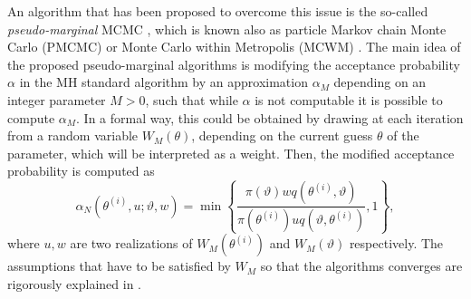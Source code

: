 An algorithm that has been proposed to overcome this issue is the so-called \textit{pseudo-marginal} MCMC \cite{DPD15,MLR16}, which is known also as particle Markov chain Monte Carlo (PMCMC) \cite{ADH10} or Monte Carlo within Metropolis (MCWM) \cite{AnR09}. The main idea of the proposed pseudo-marginal algorithms is modifying the acceptance probability $\alpha$ in the MH standard algorithm by an approximation $\alpha_M$ depending on an integer parameter $M > 0$, such that while $\alpha$ is not computable it is possible to compute $\alpha_M$. In a formal way, this could be obtained by drawing at each iteration from a random variable $W_M(\theta)$, depending on the current guess $\theta$ of the parameter, which will be interpreted as a weight. Then, the modified acceptance probability is computed as
\begin{equation}
	\alpha_N(\theta^{(i)}, u; \vartheta, w) = \min\left\{\frac{\pi(\vartheta)wq(\theta^{(i)}, \vartheta)}{\pi(\theta^{(i)})uq(\vartheta, \theta^{(i)})}, 1\right\},
\end{equation}
where $u, w$ are two realizations of $W_M(\theta^{(i)})$ and $W_M(\vartheta)$ respectively. The assumptions that have to be satisfied by $W_M$ so that the algorithms converges are rigorously explained in \cite{MLR16}. 